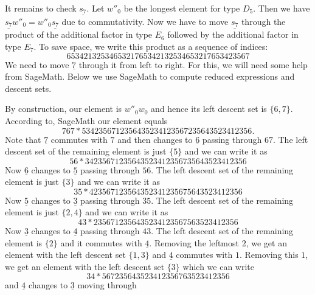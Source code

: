 \documentclass[a4paper]{amsart}
\begin{document}
It remains to check $\underline{s_{7}}$. Let
$w''_0$ be the longest element for type $D_5$.
Then we have $\underline{s_{7}}w''_0=w''_0\underline{s_{7}}$
due to commutativity. Now we have to move 
$\underline{s_{7}}$ through the product of the additional
factor in type $E_6$ followed by the additional factor in
type $E_7$. To save space, we write this product as a sequence
of indices:
\begin{displaymath}
6534213253465321765342132534653217653423567
\end{displaymath}
We need to  move $\underline{{7}}$ through it from left to right.
For this, we will need some help from SageMath. Below we use SageMath
to compute reduced expressions and descent sets.

By construction, our element is $w''_0w_0$ and hence its left descent set
is $\{6,7\}$. According to, SageMath our element equals
\begin{displaymath}
767 * 5342356712356435234123567235643523412356.
\end{displaymath}
Note that $\underline{{7}}$ commutes with $7$ and then changes to
$\underline{{6}}$ passing through $67$. The left descent set of
the remaining element is just $\{5\}$ and we can write it as 
\begin{displaymath}
56 *  34235671235643523412356735643523412356
\end{displaymath}
Now $\underline{{6}}$ changes to
$\underline{5}$ passing through $56$. The left descent set of
the remaining element is just $\{3\}$ and we can write it as 
\begin{displaymath}
35 *  423567123564352341235675643523412356
\end{displaymath}
Now $\underline{{5}}$ changes to
$\underline{3}$ passing through $35$. The left descent set of
the remaining element is just $\{2,4\}$ and we can write it as 
\begin{displaymath}
43 *  2356712356435234123567563523412356
\end{displaymath}
Now $\underline{{3}}$ changes to
$\underline{4}$ passing through $43$. The left descent set of
the remaining element is $\{2\}$ and it commutes with 
$\underline{4}$. Removing the leftmost $2$, we get an element 
with the left descent set $\{1,3\}$ and $\underline{4}$ commutes
with $1$. Removing this $1$, we get an element 
with the left descent set $\{3\}$ which we can write
\begin{displaymath}
34 *  567235643523412356763523412356
\end{displaymath}
and $\underline{4}$ changes to $\underline{3}$ moving through
\end{document}
